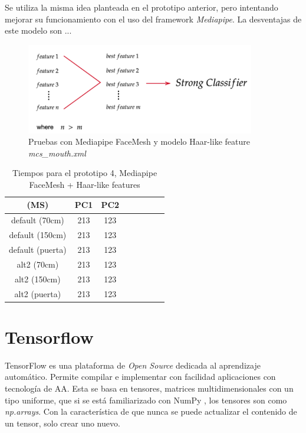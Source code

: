 Se utiliza la misma idea planteada en el prototipo anterior, pero intentando mejorar su funcionamiento con el uso del framework \textit{Mediapipe}. La desventajas de este modelo son ...

\begin{figure}[htp]
	\centering
	\includegraphics[width=10cm]{imagenes/ada1.png}
	\caption{Pruebas con Mediapipe FaceMesh y modelo Haar-like feature \textit{mcs\_mouth.xml}}
	\label{fig:protoMediapipe}
\end{figure}

\begin{table}[h!]
	\begin{center}
		\begin{tabular}{ |c|c|c|c|c|c|c|c| } 
			\hline
			(MS) & PC1 & PC2 \\
			\hline
			default (70cm) & 213  & 123  \\
			\hline
			default (150cm) & 213  & 123 \\
			\hline
			default (puerta) & 213  & 123 \\
			\hline
			alt2 (70cm) & 213  & 123  \\
			\hline
			alt2 (150cm) & 213  & 123 \\
			\hline
			alt2 (puerta) & 213  & 123 \\
			\hline
		\end{tabular}
		\caption{Tiempos para el prototipo 4, Mediapipe FaceMesh + Haar-like features}
		\label{tab:table5}
	\end{center}
\end{table}

\newpage
\section{Tensorflow}

TensorFlow es una plataforma de \textit{Open Source} dedicada al aprendizaje automático. Permite compilar e implementar con facilidad aplicaciones con tecnología de AA. Esta se basa en tensores, matrices multidimensionales con un tipo uniforme, que si se está familiarizado con NumPy , los tensores son como \textit{np.arrays}. Con la característica de que nunca se puede actualizar el contenido de un tensor, solo crear uno nuevo. \cite{tensorflow}

